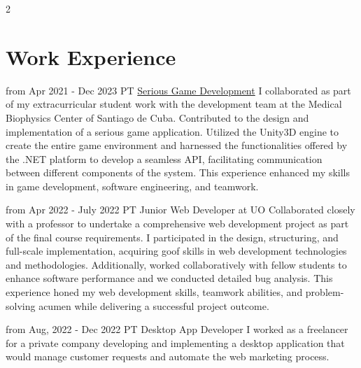 \documentclass[10pt]{curriculum}
\begin{document}
\begin{paracol}{2}


\section{Work Experience}





\jobentry
	{from Apr 2021 - Dec 2023} %
	{PT} %
	{} %
	{\href{https://www.cent.uo.edu.cu/cbm/483-2/}{Serious Game Development}} %
	{I collaborated as part of my extracurricular student work with the development team at the Medical Biophysics Center of Santiago de Cuba. Contributed to the design and implementation of a serious game application. Utilized the Unity3D engine to create the entire game environment and harnessed the functionalities offered by the .NET platform to develop a seamless API, facilitating communication between different components of the system. This experience enhanced my skills in game development, software engineering, and teamwork.}

\jobentry
	{from Apr 2022 - July 2022} %
	{PT} %
	{}
	{Junior Web Developer at UO}
	{Collaborated closely with a professor to undertake a comprehensive web development project as part of the final course requirements. I participated in the design, structuring, and full-scale implementation, acquiring goof skills in web development technologies and methodologies. Additionally, worked collaboratively with fellow students to enhance software performance and we conducted detailed bug analysis. This experience honed my web development skills, teamwork abilities, and problem-solving acumen while delivering a successful project outcome.}

\jobentry
	{from Aug, 2022 - Dec 2022} %
	{PT} %
	{}
	{Desktop App Developer}
	{I worked as a freelancer for a private company developing and implementing a desktop application that would manage customer requests and automate the web marketing process.}


\end{paracol}
\end{document}
